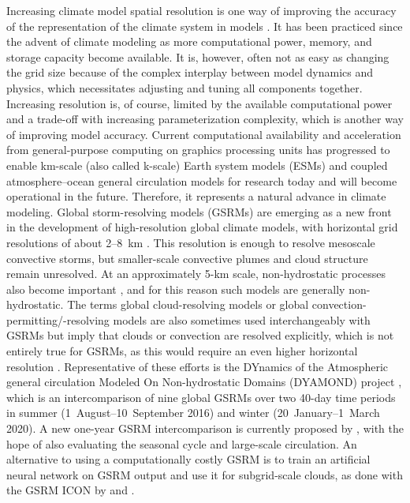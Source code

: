 \documentclass[draft]{agujournal2019}
\begin{document}
Increasing climate model spatial resolution is one way of improving the accuracy of the representation of the climate system in models \cite{mauritsen2022}. It has been practiced since the advent of climate modeling as more computational power, memory, and storage capacity become available. It is, however, often not as easy as changing the grid size because of the complex interplay between model dynamics and physics, which necessitates adjusting and tuning all components together. Increasing resolution is, of course, limited by the available computational power and a trade-off with increasing parameterization complexity, which is another way of improving model accuracy. Current computational availability and acceleration from general-purpose computing on graphics processing units has progressed to enable km-scale (also called k-scale) Earth system models (ESMs) and coupled atmosphere–ocean general circulation models for research today and will become operational in the future. Therefore, it represents a natural advance in climate modeling. Global storm-resolving models (GSRMs) are emerging as a new front in the development of high-resolution global climate models, with horizontal grid resolutions of about 2–8~km \cite{satoh2019,stevens2019}. This resolution is enough to resolve mesoscale convective storms, but smaller-scale convective plumes and cloud structure remain unresolved. At an approximately 5-km scale, non-hydrostatic processes also become important \cite{weisman1997}, and for this reason such models are generally non-hydrostatic. The terms global cloud-resolving models or global convection-permitting/-resolving models are also sometimes used interchangeably with GSRMs but imply that clouds or convection are resolved explicitly, which is not entirely true for GSRMs, as this would require an even higher horizontal resolution \cite{satoh2019}. Representative of these efforts is the DYnamics of the Atmospheric general circulation Modeled On Non-hydrostatic Domains (DYAMOND) project \cite{stevens2019,dyamond}, which is an intercomparison of nine global GSRMs over two 40-day time periods in summer (1~August–10~September 2016) and winter (20~January–1~March 2020). A new one-year GSRM intercomparison is currently proposed by , with the hope of also evaluating the seasonal cycle and large-scale circulation. An alternative to using a computationally costly GSRM is to train an artificial neural network on GSRM output and use it for subgrid-scale clouds, as done with the GSRM ICON by  and .
\end{document}
